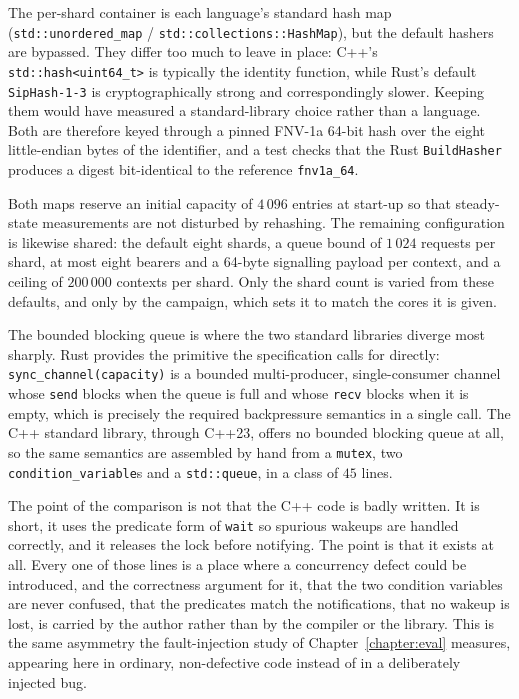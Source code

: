 \documentclass[english,twoside,openright,a4paper,censored,csm,software-track-2020]{HYthesisML}
\begin{document}
The per-shard container is each language's standard hash map (\texttt{std::unordered\_map} /
\texttt{std::collections::HashMap}), but the default hashers are bypassed. They differ too much
to leave in place: C++'s \texttt{std::hash<uint64\_t>} is typically the identity function, while
Rust's default \texttt{SipHash-1-3} is cryptographically strong and correspondingly slower.
Keeping them would have measured a standard-library choice rather than a language. Both are
therefore keyed through a pinned FNV-1a 64-bit hash over the eight little-endian bytes of the
identifier, and a test checks that the Rust \texttt{BuildHasher} produces a digest bit-identical
to the reference \texttt{fnv1a\_64}.

Both maps reserve an initial capacity of $4\,096$ entries at start-up so that steady-state
measurements are not disturbed by rehashing. The remaining configuration is likewise shared:
the default eight shards, a queue bound of
$1\,024$ requests per shard, at most eight bearers and a 64-byte signalling payload per
context, and a ceiling of $200\,000$ contexts per shard. Only the shard count is varied from
these defaults, and only by the campaign, which sets it to match the cores it is given.

The bounded blocking queue is where the two standard libraries diverge most sharply. Rust
provides the primitive the specification calls for directly: \texttt{sync\_channel(capacity)} is
a bounded multi-producer, single-consumer channel whose \texttt{send} blocks when the queue is
full and whose \texttt{recv} blocks when it is empty, which is precisely the required
backpressure semantics in a single call. The C++ standard library, through C++23, offers no
bounded blocking queue at all, so the same semantics are assembled by hand from a
\texttt{mutex}, two \texttt{condition\_variable}s and a \texttt{std::queue}, in a class of $45$
lines.

The point of the comparison is not that the C++ code is badly written. It is short, it uses
the predicate form of \texttt{wait} so spurious wakeups are handled correctly, and it releases
the lock before notifying. The point is that it exists at all. Every one of those lines is a
place where a concurrency defect could be introduced, and the correctness argument for it,
that the two condition variables are never confused, that the predicates match the
notifications, that no wakeup is lost, is carried by the author rather than by the compiler or
the library. This is the same asymmetry the fault-injection study of Chapter~\ref{chapter:eval}
measures, appearing here in ordinary, non-defective code instead of in a deliberately injected
bug.
\end{document}
